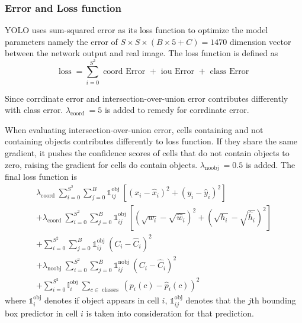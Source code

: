 \documentclass[catalog.tex]{subfiles}
\begin{document}
\subsubsection*{Error and Loss function}
\par YOLO uses sum-squared error as its loss function to optimize the model parameters namely the error of $S \times S \times (B \times 5 + C)=1470$ dimension vector between the network output and real image. 
The loss function is defined as
$$
\operatorname{loss}=\sum_{i=0}^{S^{2}} \text { coord Error }+\text { iou Error }+\text { class Error }
$$
\par Since corrdinate error and intersection-over-union error contributes differently with class error. $\lambda_{\text {coord }}=5$ is added to remedy for corrdinate error.
\par When evaluating intersection-over-union error, cells containing and not containing objects contributes differently to loss function. If they share the same gradient, it pushes the confidence scores of cells that do not contain objects to zero, raising the gradient for cells do contain objects. $\lambda_{\text {noobj }}=0.5$ is added.
The final loss function is ~\cite{redmon2015look}
$$
\begin{aligned} \lambda_{\text {coord }} \sum_{i=0}^{S^{2}} \sum_{j=0}^{B} \mathbb{1}_{i j}^{\text {obj }}\left[\left(x_{i}-\hat{x}_{i}\right)^{2}+\left(y_{i}-\hat{y}_{i}\right)^{2}\right] \\+\lambda_{\text {coord }} \sum_{i=0}^{S^{2}} \sum_{j=0}^{B} \mathbb{1}_{i j}^{\text {obj }}\left[(\sqrt{w_{i}}-\sqrt{\hat{w}_{i}})^{2}+(\sqrt{h_{i}}-\sqrt{\hat{h}_{i}})^{2}\right] \\+\sum_{i=0}^{S^{2}} \sum_{j=0}^{B} \mathbb{1}_{i j}^{\text {obj }}\left(C_{i}-\hat{C}_{i}\right)^{2} \\+\lambda_{\text {noobj }} \sum^{S^{2}}_{i=0} \sum_{j=0}^{B} \mathbb{1}_{i j}^{\text {nobj }}\left(C_{i}-\hat{C}_{i}\right)^{2} \\ +\sum_{i=0}^{S^{2}} \mathbb{I}_{i}^{\text {obj }} \sum_{c \in \text { classes }}\left(p_{i}(c)-\hat{p}_{i}(c)\right)^{2} \end{aligned}
$$
where $\mathbb{1}_{i}^{\mathrm{obj}}$ denotes if object appears in cell $i$, $\mathbb{1}_{ij}^{\mathrm{obj}}$ denotes that the $j$th bounding box predictor in cell $i$ is taken into consideration for that prediction.
\end{document}

